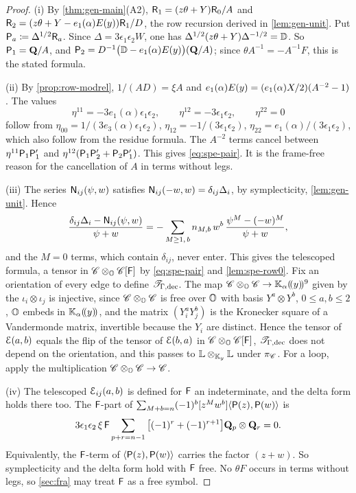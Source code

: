 \begin{proof}
(i) By \cref{thm:gen-main}(A2), $\mathsf{R}_1=(z\theta+Y)\mathsf{R}_0/A$ and $\mathsf{R}_2=(z\theta+Y-e_1(\alpha)E(y))\mathsf{R}_1/D$, the row recursion derived in \cref{lem:gen-unit}. Put $\mathsf{P}_a\coloneqq\Delta^{1/2}\mathsf{R}_a$. Since $\Delta=3\epsilon_1\epsilon_2W$, one has $\Delta^{1/2}(z\theta+Y)\Delta^{-1/2}=\mathbb{D}$. So $\mathsf{P}_1=\mathbf{Q}/A$, and $\mathsf{P}_2=D^{-1}\big(\mathbb{D}-e_1(\alpha)E(y)\big)(\mathbf{Q}/A)$; since $\theta A^{-1}=-A^{-1}F$, this is the stated formula.

(ii) By \cref{prop:row-modrel}, $1/(AD)=\xi A$ and $e_1(\alpha)E(y)=(e_1(\alpha)X/2)(A^{-2}-1)$. The values
\[
\eta^{11}=-3e_1(\alpha)\epsilon_1\epsilon_2,\qquad\eta^{12}=-3\epsilon_1\epsilon_2,\qquad\eta^{22}=0
\]
follow from $\eta_{00}=1/(3e_3(\alpha)\epsilon_1\epsilon_2)$, $\eta_{12}=-1/(3\epsilon_1\epsilon_2)$, $\eta_{22}=e_1(\alpha)/(3\epsilon_1\epsilon_2)$, which also follow from the residue formula. The $A^{-2}$ terms cancel between $\eta^{11}\mathsf{P}_1\mathsf{P}_1'$ and $\eta^{12}(\mathsf{P}_1\mathsf{P}_2'+\mathsf{P}_2\mathsf{P}_1')$. This gives \eqref{eq:spe-pair}. It is the frame-free reason for the cancellation of $A$ in terms without legs.

(iii) The series $\mathsf{N}_{ij}(\psi,w)$ satisfies $\mathsf{N}_{ij}(-w,w)=\delta_{ij}\Delta_i$, by symplecticity, \cref{lem:gen-unit}. Hence
\[
\frac{\delta_{ij}\Delta_i-\mathsf{N}_{ij}(\psi,w)}{\psi+w}=-\sum_{M\geq1,\,b}n_{M,b}\,w^b\,\frac{\psi^M-(-w)^M}{\psi+w},
\]
and the $M=0$ terms, which contain $\delta_{ij}$, never enter. This gives the telescoped formula, a tensor in $\mathscr{C}\otimes_{\mathbb{O}}\mathscr{C}[\mathsf{F}]$ by \eqref{eq:spe-pair} and \cref{lem:spe-row0}. Fix an orientation of every edge to define $\mathscr{T}_{\Gamma,\mathrm{dec}}$. The map $\mathscr{C}\otimes_{\mathbb{O}}\mathscr{C}\to\mathbb{K}_{\alpha}(\!(y)\!)^{9}$ given by the $\iota_i\otimes\iota_j$ is injective, since $\mathscr{C}\otimes_{\mathbb{O}}\mathscr{C}$ is free over $\mathbb{O}$ with basis $Y^a\otimes Y^b$, $0\leq a,b\leq2$, $\mathbb{O}$ embeds in $\mathbb{K}_{\alpha}(\!(y)\!)$, and the matrix $(Y_i^aY_j^b)$ is the Kronecker square of a Vandermonde matrix, invertible because the $Y_i$ are distinct. Hence the tensor of $\mathcal{E}(a,b)$ equals the flip of the tensor of $\mathcal{E}(b,a)$ in $\mathscr{C}\otimes_{\mathbb{O}}\mathscr{C}[\mathsf{F}]$, $\mathscr{T}_{\Gamma,\mathrm{dec}}$ does not depend on the orientation, and this passes to $\mathbb{L}\otimes_{\mathbb{K}_{y}}\mathbb{L}$ under $\pi_{\mathscr{C}}$. For a loop, apply the multiplication $\mathscr{C}\otimes_{\mathbb{O}}\mathscr{C}\to\mathscr{C}$.

(iv) The telescoped $\mathcal{E}_{ij}(a,b)$ is defined for $\mathsf{F}$ an indeterminate, and the delta form holds there too. The $\mathsf{F}$-part of $\sum_{M+b=n}(-1)^b[z^Mw^b]\langle\mathsf{P}(z),\mathsf{P}(w)\rangle$ is
\[
3\epsilon_1\epsilon_2\,\xi\,\mathsf{F}\sum_{p+r=n-1}\big[(-1)^r+(-1)^{r+1}\big]\mathbf{Q}_p\otimes\mathbf{Q}_r=0.
\]
Equivalently, the $\mathsf{F}$-term of $\langle\mathsf{P}(z),\mathsf{P}(w)\rangle$ carries the factor $(z+w)$. So symplecticity and the delta form hold with $\mathsf{F}$ free. No $\theta F$ occurs in terms without legs, so \cref{sec:fra} may treat $\mathsf{F}$ as a free symbol.


\end{proof}
